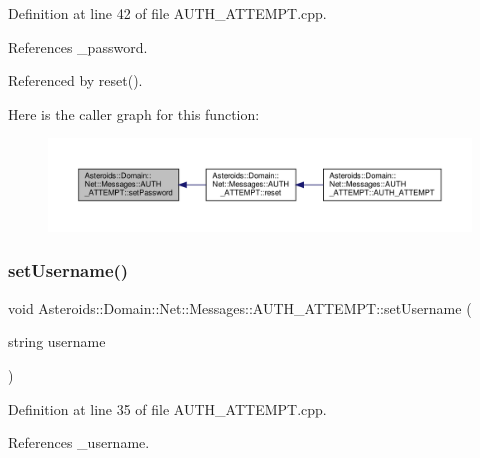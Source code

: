 Definition at line 42 of file A\+U\+T\+H\+\_\+\+A\+T\+T\+E\+M\+P\+T.\+cpp.



References \+\_\+password.



Referenced by reset().

Here is the caller graph for this function\+:\nopagebreak
\begin{figure}[H]
\begin{center}
\leavevmode
\includegraphics[width=350pt]{classAsteroids_1_1Domain_1_1Net_1_1Messages_1_1AUTH__ATTEMPT_ab05c3f631e0ac62fdefe27e95b5066a2_icgraph}
\end{center}
\end{figure}
\mbox{\label{classAsteroids_1_1Domain_1_1Net_1_1Messages_1_1AUTH__ATTEMPT_a70aded9fd40631e8b8e53b183b62b3d8}} 
\subsubsection{\texorpdfstring{set\+Username()}{setUsername()}}
{\footnotesize\ttfamily void Asteroids\+::\+Domain\+::\+Net\+::\+Messages\+::\+A\+U\+T\+H\+\_\+\+A\+T\+T\+E\+M\+P\+T\+::set\+Username (\begin{DoxyParamCaption}\item[{string}]{username }\end{DoxyParamCaption})}



Definition at line 35 of file A\+U\+T\+H\+\_\+\+A\+T\+T\+E\+M\+P\+T.\+cpp.



References \+\_\+username.



